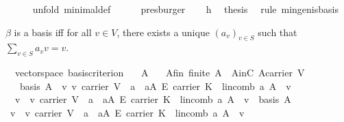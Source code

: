 \begin{isabellebody}
\ \ \ \ \isamarkupfalse%
\ {\isacharparenleft}unfold\ minimal{\isacharunderscore}def{\isacharparenright}\isanewline
\ \ \ \ \isamarkupfalse%
\ presburger\isanewline
\ \ \isamarkupfalse%
\ h{}\ \isamarkupfalse%
\ {\isacharquery}thesis\ \isamarkupfalse%
\ {\isacharparenleft}rule\ min{\isacharunderscore}gen{\isacharunderscore}is{\isacharunderscore}basis{\isacharparenright}\isanewline
{}\isamarkupfalse%
%
\endisatagproof
{\isafoldproof}%
%
\isadelimproof
%
\endisadelimproof
%
\begin{isamarkuptext}%
$\beta$ is a basis iff for all $v\in V$, there exists a unique $(a_v)_{v\in S}$ such that
$\sum_{v\in S} a_v v=v$.%
\end{isamarkuptext}%
\isamarkuptrue%
\isamarkupfalse%
\ {\isacharparenleft}\ vectorspace{\isacharparenright}\ basis{\isacharunderscore}criterion{\isacharcolon}\isanewline
\ \ \ A\isanewline
\ \ \ A{\isacharunderscore}fin{\isacharcolon}\ {\isachardoublequoteopen}finite\ A{\isachardoublequoteclose}\ \ AinC{\isacharcolon}\ {\isachardoublequoteopen}A{\isasymsubseteq}carrier\ V{\isachardoublequoteclose}\isanewline
\ \ \ {\isachardoublequoteopen}basis\ A\ {\isacharless}{\isacharminus}{\isachargreater}\ {\isacharparenleft}{\isasymforall}v{\isachardot}\ v{\isasymin}\ carrier\ V\ {\isasymlongrightarrow}{\isacharparenleft}{\isasymexists}{\isacharbang}\ a{\isachardot}\ \ a{\isasymin}A\ {\isasymrightarrow}\isactrlsub E\ carrier\ K\ {\isasymand}\ lincomb\ a\ A\ {\isacharequal}\ v{\isacharparenright}{\isacharparenright}{\isachardoublequoteclose}\isanewline
%
\isadelimproof
%
\endisadelimproof
%
\isatagproof
{}\isamarkupfalse%
\ {\isacharminus}\isanewline
\ \ \isamarkupfalse%
\ {}{\isacharcolon}\ {\isachardoublequoteopen}{\isasymnot}{\isacharparenleft}{\isasymforall}v{\isachardot}\ \ v{\isasymin}\ carrier\ V\ {\isasymlongrightarrow}{\isacharparenleft}{\isasymexists}{\isacharbang}\ a{\isachardot}\ \ a{\isasymin}A\ {\isasymrightarrow}\isactrlsub E\ carrier\ K\ {\isasymand}\ lincomb\ a\ A\ {\isacharequal}\ v{\isacharparenright}{\isacharparenright}\ {\isasymLongrightarrow}\ {\isasymnot}basis\ A{\isachardoublequoteclose}\isanewline
\ \ \isamarkupfalse%
\ {\isacharminus}\ \isanewline
\ \ \ \ \isamarkupfalse%
\ {\isachardoublequoteopen}{\isasymnot}{\isacharparenleft}{\isasymforall}v{\isachardot}\ \ v{\isasymin}\ carrier\ V\ {\isasymlongrightarrow}{\isacharparenleft}{\isasymexists}{\isacharbang}\ a{\isachardot}\ \ a{\isasymin}A\ {\isasymrightarrow}\isactrlsub E\ carrier\ K\ {\isasymand}\ lincomb\ a\ A\ {\isacharequal}\ v{\isacharparenright}{\isacharparenright}{\isachardoublequoteclose}\isanewline

\end{isabellebody}
